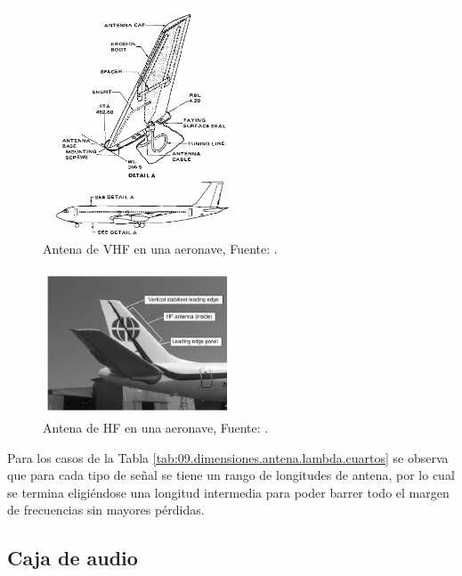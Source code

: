 \begin{figure}[!htb]
  \centering
  \includegraphics[width=0.5\textwidth]{09.sintesis.comunicaciones.a.bordo/Imagenes.U09/antena_vhf.png}
  \caption{Antena de VHF en una aeronave, Fuente: \protect\cite{eismin1994aircraft}.}
  \label{fig:vhf.antena.aeronave}
\end{figure}


\begin{figure}[!htb]
  \centering
  \includegraphics[width=0.5\textwidth]{09.sintesis.comunicaciones.a.bordo/Imagenes.U09/antena_hf.png}
  \caption{Antena de HF en una aeronave, Fuente: \protect\cite{Tooley_Aircraft_communications_and_navigation_systems}.}
  \label{fig:vhf.antena.aeronave}
\end{figure}


Para los casos de la Tabla \ref{tab:09.dimensiones.antena.lambda.cuartos} se observa que para cada tipo de se\~nal se tiene un rango de longitudes de antena, por lo cual se termina  eligi\'endose una longitud intermedia para poder barrer todo el margen de frecuencias sin mayores p\'erdidas. 



\subsection{Caja de audio}
\label{sec:09.02.03.caja.audio}

